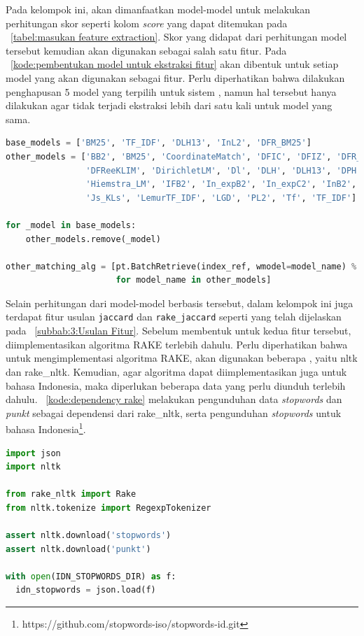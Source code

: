 Pada kelompok ini, akan dimanfaatkan model-model \base{} \retriever{} untuk melakukan perhitungan skor seperti kolom \textit{score} yang dapat ditemukan pada \tabel{}~\ref{tabel:masukan feature extraction}. Skor yang didapat dari perhitungan model tersebut kemudian akan digunakan sebagai salah satu fitur. Pada \kode{}~\ref{kode:pembentukan model untuk ekstraksi fitur} akan dibentuk \pipeline{} untuk setiap model \base{} \retriever{} yang akan digunakan sebagai fitur. Perlu diperhatikan bahwa dilakukan penghapusan 5 model \base{} \retriever{} yang terpilih untuk sistem \ir{}, namun hal tersebut hanya dilakukan agar tidak terjadi ekstraksi lebih dari satu kali untuk model yang sama.
\begin{lstlisting}[language=Python, caption={\Pipeline{} ekstraksi fitur skor \base{} \retriever{}}, label={kode:pembentukan model untuk ekstraksi fitur}]
base_models = ['BM25', 'TF_IDF', 'DLH13', 'InL2', 'DFR_BM25']
other_models = ['BB2', 'BM25', 'CoordinateMatch', 'DFIC', 'DFIZ', 'DFR_BM25', 'DFRee',
                'DFReeKLIM', 'DirichletLM', 'Dl', 'DLH', 'DLH13', 'DPH', 'XSqrA_M',
                'Hiemstra_LM', 'IFB2', 'In_expB2', 'In_expC2', 'InB2', 'InL2',
                'Js_KLs', 'LemurTF_IDF', 'LGD', 'PL2', 'Tf', 'TF_IDF']

for _model in base_models:
    other_models.remove(_model) 

other_matching_alg = [pt.BatchRetrieve(index_ref, wmodel=model_name) % cut_off
                      for model_name in other_models]
\end{lstlisting}

Selain perhitungan dari model-model berbasis \txt{} \matching{} tersebut, dalam kelompok ini juga terdapat fitur usulan \lstinline{jaccard} dan \lstinline{rake_jaccard} seperti yang telah dijelaskan pada \subbab{}~\ref{subbab:3:Usulan Fitur}. Sebelum membentuk \pipeline{} untuk kedua fitur tersebut, diimplementasikan algoritma RAKE terlebih dahulu. Perlu diperhatikan bahwa untuk mengimplementasi algoritma RAKE, akan digunakan beberapa \library{}, yaitu nltk dan rake\_nltk. Kemudian, agar algoritma dapat diimplementasikan juga untuk bahasa Indonesia, maka diperlukan beberapa data yang perlu diunduh terlebih dahulu. \kode{}~\ref{kode:dependency rake} melakukan pengunduhan data \textit{stopwords} dan \textit{punkt} sebagai dependensi dari \library{} rake\_nltk, serta pengunduhan \textit{stopwords} untuk bahasa Indonesia\footnote{https://github.com/stopwords-iso/stopwords-id.git}.
\begin{lstlisting}[language=Python, caption={Dependensi algoritma RAKE}, label={kode:dependency rake}]
import json
import nltk

from rake_nltk import Rake
from nltk.tokenize import RegexpTokenizer

assert nltk.download('stopwords')
assert nltk.download('punkt')

with open(IDN_STOPWORDS_DIR) as f:
  idn_stopwords = json.load(f)
\end{lstlisting}

